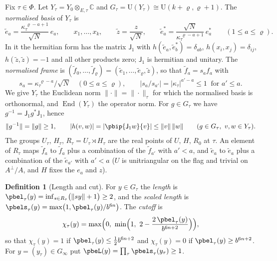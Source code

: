 \documentclass[10pt]{amsart}
\theoremstyle{definition}
\newtheorem{definition}[theorem]{Definition}
\theoremstyle{remark}
\newcommand{\C}{\mathbb C}
\providecommand{\auPl}{\Phi}
\providecommand{\auU}{\mathrm U}
\begin{document}
Fix $\tau\in\auPl$. Let $Y_\tau=Y_0\otimes_{E,\tau}\C$ and $G_\tau=\auU(Y_\tau)\cong\auU(k+\varrho,
\varrho+1)$. The \emph{normalised basis} of $Y_\tau$ is
\[
\tilde e_a=\frac{\kappa_\tau^{\,\varrho-a+1}}{\sqrt N}\,e_a,\qquad x_1,\dots,x_k,\qquad\tilde z=
\frac z{\sqrt N},\qquad\tilde e_a^*=\frac{\sqrt N}{\kappa_\tau^{\,\varrho-a+1}}\,e_a^*\qquad(1\le
a\le\varrho).
\]
In it the hermitian form has the matrix $\mathsf J_1$ with $h(\tilde e_a,\tilde e_b^*)=\delta_{ab}$,
$h(x_i,x_j)=\delta_{ij}$, $h(\tilde z,\tilde z)=-1$ and all other products zero; $\mathsf J_1$ is
hermitian and unitary. The \emph{normalised frame} is $(\tilde f_0,\dots,\tilde f_\varrho)=(\tilde
e_1,\dots,\tilde e_\varrho,\tilde z)$, so that $\tilde f_a=s_a f_a$ with
\begin{equation}\label{pbe:eq-scale}
s_a=\kappa_\tau^{\,\varrho-a}/\sqrt N\quad(0\le a\le\varrho),\qquad|s_a/s_{a'}|=|\kappa_\tau|^{a'-a}
\le1\ \text{ for }a'\le a .
\end{equation}
We give $Y_\tau$ the Euclidean norm $\|\cdot\|=\|\cdot\|_\tau$ for which the normalised basis is
orthonormal, and $\operatorname{End}(Y_\tau)$ the operator norm. For $g\in G_\tau$ we have $g^{-1}=
\mathsf J_1g^*\mathsf J_1$, hence
\begin{equation}\label{pbe:eq-norm}
\|g^{-1}\|=\|g\|\ge1,\qquad|h(v,w)|=|\pbip{\mathsf J_1w}{v}|\le\|v\|\,\|w\|\qquad(g\in G_\tau,\ v,w\in
Y_\tau).
\end{equation}
The groups $U_\tau$, $H_\tau$, $R_\tau=U_\tau\rtimes H_\tau$ are the real points of $U$, $H$, $R_0$
at $\tau$. An element of $R_\tau$ maps $\tilde f_a$ to $\tilde f_a$ plus a combination of the
$\tilde f_{a'}$ with $a'<a$, and $\tilde e_a$ to $\tilde e_a$ plus a combination of the $\tilde
e_{a'}$ with $a'<a$ ($U$ is unitriangular on the flag and trivial on $A^\perp/A$, and $H$ fixes the
$e_a$ and $z$).

\begin{definition}[Length and cut]\label{pbe:length}
For $y\in G_\tau$ the \emph{length} is $\pbel_\tau(y)=\inf_{s\in R_\tau}\bigl(\|sy\|+1\bigr)\ge2$,
and the \emph{scaled length} is $\pbels_\tau(y)=\max\bigl(1,\pbel_\tau(y)/b^{6n}\bigr)$. The
\emph{cutoff} is
\begin{equation}\label{pbe:eq-chi}
\chi_\tau(y)=\max\Bigl(0,\ \min\Bigl(1,\ 2-\frac{2\,\pbel_\tau(y)}{b^{6n+2}}\Bigr)\Bigr),
\end{equation}
so that $\chi_\tau(y)=1$ if $\pbel_\tau(y)\le\frac12b^{6n+2}$ and $\chi_\tau(y)=0$ if $\pbel_\tau(y)
\ge b^{6n+2}$. For $y=(y_\tau)\in G_\infty$ put $\pbeL(y)=\prod_\tau\pbels_\tau(y_\tau)\ge1$.
\end{definition}
\end{document}
